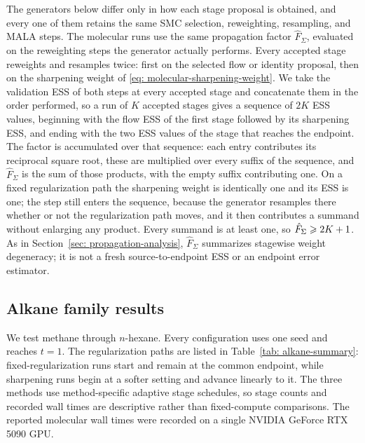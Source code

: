 \documentclass{article}
\begin{document}
The generators below differ only in how each stage proposal is obtained, and every one of them retains the same SMC selection, reweighting, resampling, and MALA steps.
The molecular runs use the same propagation factor $\hat F_\Sigma$, evaluated on the reweighting steps the generator actually performs. Every accepted stage reweights and resamples twice: first on the selected flow or identity proposal, then on the sharpening weight of \eqref{eq: molecular-sharpening-weight}. We take the validation ESS of both steps at every accepted stage and concatenate them in the order performed, so a run of $K$ accepted stages gives a sequence of $2K$ ESS values, beginning with the flow ESS of the first stage followed by its sharpening ESS, and ending with the two ESS values of the stage that reaches the endpoint. The factor is accumulated over that sequence: each entry contributes its reciprocal square root, these are multiplied over every suffix of the sequence, and $\hat F_\Sigma$ is the sum of those products, with the empty suffix contributing one. On a fixed regularization path the sharpening weight is identically one and its ESS is one; the step still enters the sequence, because the generator resamples there whether or not the regularization path moves, and it then contributes a summand without enlarging any product. Every summand is at least one, so $\hat F_\Sigma \geqslant 2K+1$. As in Section~\ref{sec: propagation-analysis}, $\hat F_\Sigma$ summarizes stagewise weight degeneracy; it is not a fresh source-to-endpoint ESS or an endpoint error estimator.

\subsection{Alkane family results}
\label{sec: alkane-results}

We test methane through \(n\)-hexane. Every configuration uses one seed and reaches \(t=1\). The regularization paths are listed in Table~\ref{tab: alkane-summary}: fixed-regularization runs start and remain at the common endpoint, while sharpening runs begin at a softer setting and advance linearly to it. The three methods use method-specific adaptive stage schedules, so stage counts and recorded wall times are descriptive rather than fixed-compute comparisons. The reported molecular wall times were recorded on a single NVIDIA GeForce RTX 5090 GPU.
\end{document}

